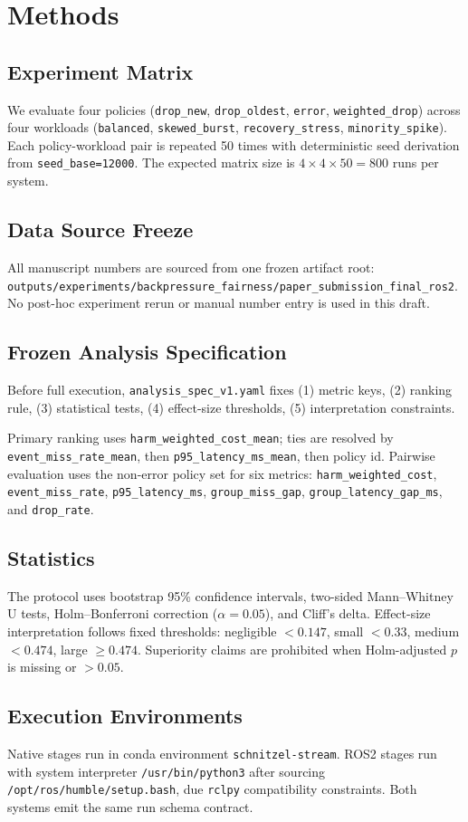 \section{Methods}
\subsection{Experiment Matrix}
We evaluate four policies (\texttt{drop\_new}, \texttt{drop\_oldest}, \texttt{error}, \texttt{weighted\_drop})
across four workloads (\texttt{balanced}, \texttt{skewed\_burst}, \texttt{recovery\_stress}, \texttt{minority\_spike}).
Each policy-workload pair is repeated 50 times with deterministic seed derivation from \texttt{seed\_base=12000}.
The expected matrix size is \(4 \times 4 \times 50 = 800\) runs per system.

\subsection{Data Source Freeze}
All manuscript numbers are sourced from one frozen artifact root:
\texttt{outputs/experiments/backpressure\_fairness/paper\_submission\_final\_ros2}.
No post-hoc experiment rerun or manual number entry is used in this draft.

\subsection{Frozen Analysis Specification}
Before full execution, \texttt{analysis\_spec\_v1.yaml} fixes
(1) metric keys,
(2) ranking rule,
(3) statistical tests,
(4) effect-size thresholds,
(5) interpretation constraints.

Primary ranking uses \texttt{harm\_weighted\_cost\_mean}; ties are resolved by
\texttt{event\_miss\_rate\_mean}, then \texttt{p95\_latency\_ms\_mean}, then policy id.
Pairwise evaluation uses the non-error policy set for six metrics:
\texttt{harm\_weighted\_cost}, \texttt{event\_miss\_rate}, \texttt{p95\_latency\_ms},
\texttt{group\_miss\_gap}, \texttt{group\_latency\_gap\_ms}, and \texttt{drop\_rate}.

\subsection{Statistics}
The protocol uses bootstrap 95\% confidence intervals, two-sided Mann--Whitney U tests,
Holm--Bonferroni correction (\(\alpha = 0.05\)), and Cliff's delta.
Effect-size interpretation follows fixed thresholds:
negligible \(<0.147\), small \(<0.33\), medium \(<0.474\), large \(\ge 0.474\).
Superiority claims are prohibited when Holm-adjusted \(p\) is missing or \(>0.05\).

\subsection{Execution Environments}
Native stages run in conda environment \texttt{schnitzel-stream}.
ROS2 stages run with system interpreter \texttt{/usr/bin/python3} after sourcing
\texttt{/opt/ros/humble/setup.bash}, due \texttt{rclpy} compatibility constraints.
Both systems emit the same run schema contract.
